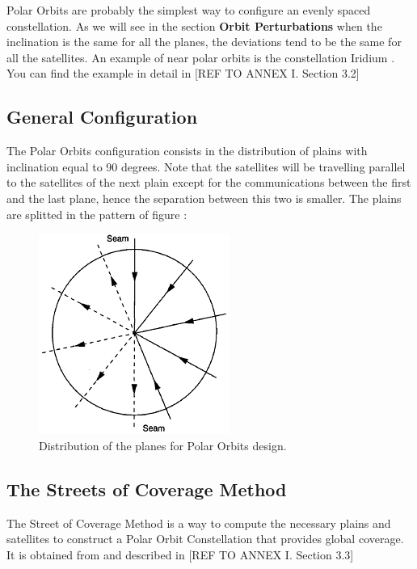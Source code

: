 Polar Orbits are probably the simplest way to configure an evenly spaced constellation. As we will see in the section \textbf{Orbit Perturbations} when the inclination is the same for all the planes, the deviations tend to be the same for all the satellites. An example of near polar orbits is the constellation Iridium \cite{Iridium}. You can find the example in detail in [{REF TO ANNEX I. Section 3.2}]

\subsection{General Configuration}
\begin{minipage}{0.45\textwidth}
The Polar Orbits configuration consists in the distribution of plains with inclination equal to 90 degrees. Note that the satellites will be travelling parallel to the satellites of the next plain except for the communications between the first and the last plane, hence the separation between this two is smaller. The plains are splitted in the pattern of figure \cite{fig:polardist}:
\end{minipage}
\vline
\begin{minipage}{0.45\textwidth}
\begin{figure}[H]\label{fig:polardist}
\begin{center}
\includegraphics[scale=0.40]{PolarOrbits/planeconfig.png}
\caption{Distribution of the planes for Polar Orbits design.}
\end{center}
\end{figure}

\end{minipage}

\subsection{The Streets of Coverage Method}
The Street of Coverage Method is a way to compute the necessary plains and satellites to construct a Polar Orbit Constellation that provides global coverage. It is obtained from 
\cite{Chobotov2002} and described in 
[{REF TO ANNEX I. Section 3.3}]

